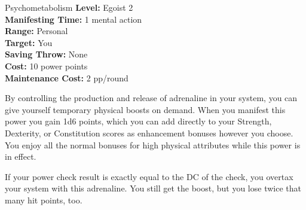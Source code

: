 {Psychometabolism}
{
	\textbf{Level:}
	Egoist 2\\
	\textbf{Manifesting Time:}
	1 mental action\\
	\textbf{Range:}
	Personal\\
	\textbf{Target:}
	You\\
	\textbf{Saving Throw:}
	None\\
	\textbf{Cost:}
	10 power points\\
	\textbf{Maintenance Cost:}
	2 pp/round\\
}
{
	By controlling the production and release of adrenaline in your system, you can give yourself temporary physical boosts on demand. When you manifest this power you gain 1d6 points, which you can add directly to your Strength, Dexterity, or Constitution scores as enhancement bonuses however you choose. You enjoy all the normal bonuses for high physical attributes while this power is in effect.

	If your power check result is exactly equal to the DC of the check, you overtax your system with this adrenaline. You still get the boost, but you lose twice that many hit points, too.
}